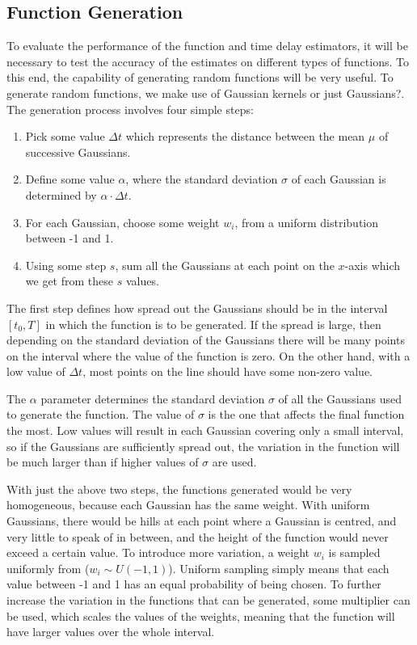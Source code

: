 \documentclass[a4paper,11pt]{article}
\begin{document}
\subsection{Function Generation}
\label{sec-5-1}

To evaluate the performance of the function and time delay estimators, it will
be necessary to test the accuracy of the estimates on different types of
functions. To this end, the capability of generating random functions will be
very useful. To generate random functions, we make use of \large{Gaussian
kernels or just Gaussians?}. The generation process involves four simple steps:
\begin{enumerate}
\item Pick some value $\Delta t$ which represents the distance between the mean
   $\mu$ of successive Gaussians.
\item Define some value $\alpha$, where the standard deviation $\sigma$ of each
   Gaussian is determined by $\alpha\cdot\Delta t$.
\item For each Gaussian, choose some weight $w_i$, from a uniform distribution
   between -1 and 1.
\item Using some step $s$, sum all the Gaussians at each point on the $x$-axis which
   we get from these $s$ values.
\end{enumerate}

The first step defines how spread out the Gaussians should be in the interval
$[t_0, T]$ in which the function is to be generated. If the spread is large,
then depending on the standard deviation of the Gaussians there will be many
points on the interval where the value of the function is zero. On the other
hand, with a low value of $\Delta t$, most points on the line should have some
non-zero value.

The $\alpha$ parameter determines the standard deviation $\sigma$ of all the Gaussians
used to generate the function. The value of $\sigma$ is the one that affects the
final function the most. Low values will result in each Gaussian covering only a
small interval, so if the Gaussians are sufficiently spread out, the variation
in the function will be much larger than if higher values of $\sigma$ are used.

With just the above two steps, the functions generated would be very
homogeneous, because each Gaussian has the same weight. With uniform Gaussians,
there would be hills at each point where a Gaussian is centred, and very little
to speak of in between, and the height of the function would never exceed a
certain value. To introduce more variation, a weight $w_i$ is sampled uniformly
from ($w_i \sim U(-1,1)$). Uniform sampling simply means that each value between
-1 and 1 has an equal probability of being chosen. To further increase the
variation in the functions that can be generated, some multiplier can be used,
which scales the values of the weights, meaning that the function will have
larger values over the whole interval.
\end{document}
